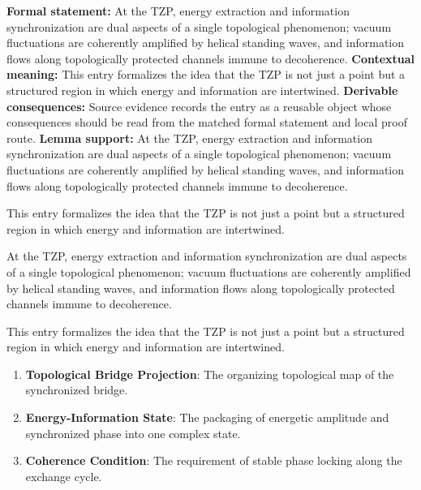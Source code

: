 \begingroup\footnotesize\setlength{\emergencystretch}{3em}\sloppy
\textbf{Formal statement:} At the TZP, energy extraction and information synchronization are dual aspects of a single topological phenomenon; vacuum fluctuations are coherently amplified by helical standing waves, and information flows along topologically protected channels immune to decoherence.  
\textbf{Contextual meaning:} This entry formalizes the idea that the TZP is not just a point but a structured region in which energy and information are intertwined.
\textbf{Derivable consequences:} Source evidence records the entry as a reusable object whose consequences should be read from the matched formal statement and local proof route.
\textbf{Lemma support:} At the TZP, energy extraction and information synchronization are dual aspects of a single topological phenomenon; vacuum fluctuations are coherently amplified by helical standing waves, and information flows along topologically protected channels immune to decoherence.  \par
\endgroup

This entry formalizes the idea that the TZP is not just a point but a structured region in which energy and information are intertwined.

At the TZP, energy extraction and information synchronization are dual aspects of a single topological phenomenon; vacuum fluctuations are coherently amplified by helical standing waves, and information flows along topologically protected channels immune to decoherence.  

This entry formalizes the idea that the TZP is not just a point but a structured region in which energy and information are intertwined.
\endgroup

\begingroup\footnotesize\sloppy
\begin{enumerate}[leftmargin=1.35em,itemsep=1pt,topsep=1pt,parsep=0pt]
\item \textbf{Topological Bridge Projection}: The organizing topological map of the synchronized bridge.
\item \textbf{Energy-Information State}: The packaging of energetic amplitude and synchronized phase into one complex state.
\item \textbf{Coherence Condition}: The requirement of stable phase locking along the exchange cycle.
\end{enumerate}
\endgroup

